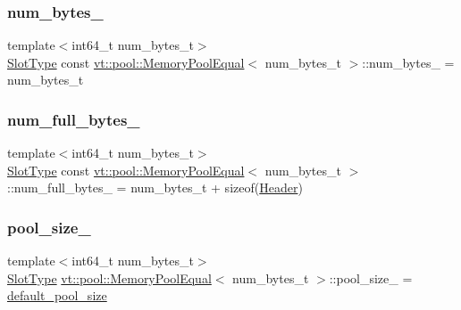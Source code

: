 \subsubsection{\texorpdfstring{num\+\_\+bytes\+\_\+}{num\_bytes\_}}
{\footnotesize\ttfamily template$<$int64\+\_\+t num\+\_\+bytes\+\_\+t$>$ \\
\hyperlink{structvt_1_1pool_1_1_memory_pool_equal_a101fdcb943d0cb0863cf17655e0b4e1c}{Slot\+Type} const \hyperlink{structvt_1_1pool_1_1_memory_pool_equal}{vt\+::pool\+::\+Memory\+Pool\+Equal}$<$ num\+\_\+bytes\+\_\+t $>$\+::num\+\_\+bytes\+\_\+ = num\+\_\+bytes\+\_\+t\hspace{0.3cm}{\ttfamily [private]}}

\mbox{\label{structvt_1_1pool_1_1_memory_pool_equal_a3ae57a1929e619eb6d346f196e0b1d2d}} 
\subsubsection{\texorpdfstring{num\+\_\+full\+\_\+bytes\+\_\+}{num\_full\_bytes\_}}
{\footnotesize\ttfamily template$<$int64\+\_\+t num\+\_\+bytes\+\_\+t$>$ \\
\hyperlink{structvt_1_1pool_1_1_memory_pool_equal_a101fdcb943d0cb0863cf17655e0b4e1c}{Slot\+Type} const \hyperlink{structvt_1_1pool_1_1_memory_pool_equal}{vt\+::pool\+::\+Memory\+Pool\+Equal}$<$ num\+\_\+bytes\+\_\+t $>$\+::num\+\_\+full\+\_\+bytes\+\_\+ = num\+\_\+bytes\+\_\+t + sizeof(\hyperlink{structvt_1_1pool_1_1_header}{Header})\hspace{0.3cm}{\ttfamily [private]}}

\mbox{\label{structvt_1_1pool_1_1_memory_pool_equal_a8f5d69e4d35c30c9f9913ccc80350f0a}} 
\subsubsection{\texorpdfstring{pool\+\_\+size\+\_\+}{pool\_size\_}}
{\footnotesize\ttfamily template$<$int64\+\_\+t num\+\_\+bytes\+\_\+t$>$ \\
\hyperlink{structvt_1_1pool_1_1_memory_pool_equal_a101fdcb943d0cb0863cf17655e0b4e1c}{Slot\+Type} \hyperlink{structvt_1_1pool_1_1_memory_pool_equal}{vt\+::pool\+::\+Memory\+Pool\+Equal}$<$ num\+\_\+bytes\+\_\+t $>$\+::pool\+\_\+size\+\_\+ = \hyperlink{structvt_1_1pool_1_1_memory_pool_equal_a67dae02a7795b182a7302b9eb34924e7}{default\+\_\+pool\+\_\+size}\hspace{0.3cm}{\ttfamily [private]}}



